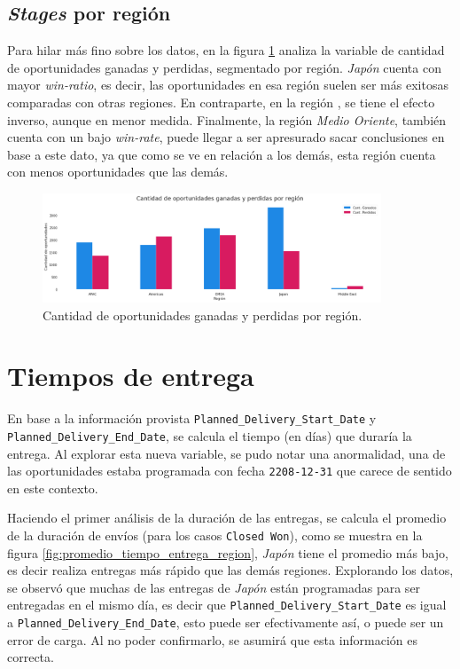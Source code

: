 \documentclass[titlepage,a4paper]{article}
\begin{document}
\subsection{\textit{Stages} por región}
Para hilar más fino sobre los datos, en la figura \ref{fig:bp_oportunidades_ganadas_y_perdidas_por_region} analiza la variable de cantidad de oportunidades ganadas y perdidas, segmentado por región. \textit{Japón} cuenta con mayor \textit{win-ratio}, es decir, las oportunidades en esa región suelen ser más exitosas comparadas con otras regiones. En contraparte, en la región , se tiene el efecto inverso, aunque en menor medida. Finalmente, la región \textit{Medio Oriente}, también cuenta con un bajo \textit{win-rate}, puede llegar a ser apresurado sacar conclusiones en base a este dato, ya que como se ve en relación a los demás, esta región cuenta con menos oportunidades que las demás.

\begin{figure}[H]
\centering
\includegraphics[width=0.9\textwidth]{images/bp_oportunidades_ganadas_y_perdidas_por_region.png}
\cprotect\caption{\label{fig:bp_oportunidades_ganadas_y_perdidas_por_region} Cantidad de oportunidades ganadas y perdidas por región. }
\end{figure}

\section{Tiempos de entrega}
En base a la información provista \verb|Planned_Delivery_Start_Date| y \verb|Planned_Delivery_End_Date|, se calcula el tiempo (en días) que duraría la entrega. Al explorar esta nueva variable, se pudo notar una anormalidad, una de las oportunidades estaba programada con fecha \verb|2208-12-31| que carece de sentido en este contexto.

Haciendo el primer análisis de la duración de las entregas, se calcula el promedio de la duración de envíos (para los casos \verb|Closed Won|), como se muestra en la figura \ref{fig:promedio_tiempo_entrega_region}, \textit{Japón} tiene el promedio más bajo, es decir realiza entregas más rápido que las demás regiones. Explorando los datos, se observó que muchas de las entregas de \textit{Japón} están programadas para ser entregadas en el mismo día, es decir que \verb|Planned_Delivery_Start_Date| es igual a \verb|Planned_Delivery_End_Date|, esto puede ser efectivamente así, o puede ser un error de carga. Al no poder confirmarlo, se asumirá que esta información es correcta.
\end{document}
